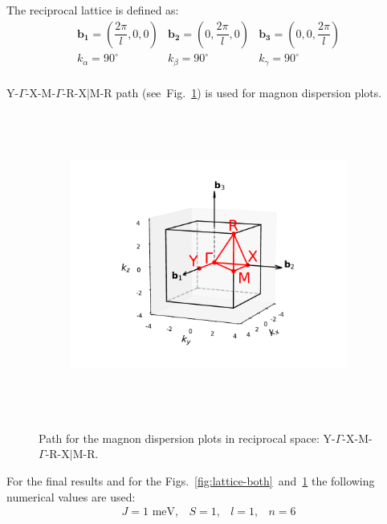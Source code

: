 \documentclass[a4paper,12pt]{article}
\begin{document}
        The reciprocal lattice is defined as:
        \begin{equation}
            \begin{matrix}
                \mathbf{b_1} = (\dfrac{2\pi}{l}, 0, 0) & \mathbf{b_2} = (0,\dfrac{2\pi}{l}, 0) & \mathbf{b_3} = (0, 0, \dfrac{2\pi}{l}) \\
                k_{\alpha} = 90^{\circ} & k_{\beta} = 90^{\circ} & k_{\gamma} = 90^{\circ} \\
            \end{matrix}
        \end{equation}

        Y-$\Gamma$-X-M-$\Gamma$-R-X$\vert$M-R path (see~Fig.~\ref{fig:path}) is used for magnon dispersion plots.

        \begin{figure}[H]
            \centering
            \begin{subfigure}[b]{0.8\textwidth}
                \centering
                \includegraphics[height=10cm]{path.pdf}
            \end{subfigure}
            \hfill
            \caption{Path for the magnon dispersion plots in reciprocal space: Y-$\Gamma$-X-M-$\Gamma$-R-X$\vert$M-R.}
            \label{fig:path}
        \end{figure}


        For the final results and for the Figs.~\ref{fig:lattice-both}~and~\ref{fig:path} the following numerical values are used:
        \begin{equation}
            \begin{matrix}
                J = 1 \text{ meV}, & S = 1, & l = 1, & n = 6
            \end{matrix}
        \end{equation}
\end{document}
